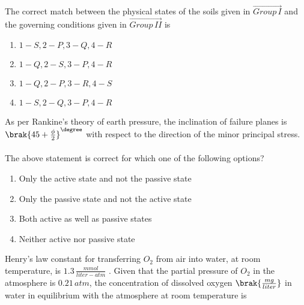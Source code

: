  \iffalse
\chapter{2022}
\author{EE24BTECH11021 - Eshan Ray}
\section{ce}
\fi
    \item The correct match between the physical states of the soils given in $\vec{Group\, I}$ and
the governing conditions given in $\vec{Group\, II}$ is 
\begin{table}[H]    
  \centering
  
 \end{table}

\begin{enumerate}
    \item $1-S, 2-P, 3-Q, 4-R$
    \item $1-Q, 2-S, 3-P, 4-R$
    \item $1-Q, 2-P, 3-R, 4-S$
    \item $1-S, 2-Q, 3-P, 4-R$
\end{enumerate}
    \item As per Rankine's theory of earth pressure, the inclination of failure planes is $\brak{45+\frac{\phi}{2}}^{\degree}$ with respect to the direction of the minor principal stress.\\ \\
    The above statement is correct for which one of the following options? 
    \begin{enumerate}
        \item Only the active state and not the passive state
        \item Only the passive state and not the active state
        \item Both active as well as passive states
        \item Neither active nor passive state 
    \end{enumerate}
    \item Henry's law constant for transferring $O_2$ from air into water, at room temperature, is $1.3\,\frac{mmol}{liter-atm}$ . Given that the partial pressure of $O_2$ in the atmosphere is $0.21\, atm$, the concentration of dissolved oxygen $\brak{\frac{mg}{liter}}$ in water in equilibrium with the atmosphere at room temperature is \\ \\
